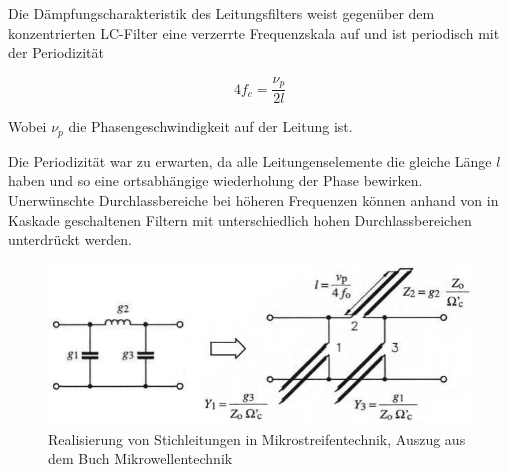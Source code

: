 Die  D\"ampfungscharakteristik  des   Leitungsfilters  weist  gegen\"uber  dem
konzentrierten  LC-Filter eine verzerrte Frequenzskala auf und ist  periodisch
mit der Periodizit\"at

\begin{equation}
    4f_c = \frac{\nu_p}{2l}
\end{equation}

Wobei $\nu_p$ die Phasengeschwindigkeit auf der Leitung ist.

Die Periodizit\"at war  zu  erwarten,  da  alle Leitungenselemente die gleiche
L\"ange $l$ haben und so eine ortsabh\"angige wiederholung der Phase bewirken.
Unerw\"unschte Durchlassbereiche bei  h\"oheren Frequenzen k\"onnen anhand von
in Kaskade geschaltenen Filtern mit unterschiedlich  hohen  Durchlassbereichen
unterdr\"uckt werden.

\begin{figure}
    \centering
    \includegraphics[width=\imagewidth]{images/LC-zu-Leitungsfilter}
    \caption{Realisierung von Stichleitungen in Mikrostreifentechnik, Auszug aus dem Buch Mikrowellentechnik\cite[p.~26]{ref:baechold}}
    \label{fig:LC-zu-Leitungsfilter}
\end{figure}

